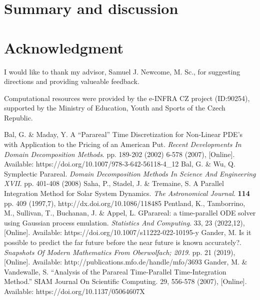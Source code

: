 \documentclass[conference]{IEEEtran}
\begin{document}
\section{Summary and discussion}

\section*{Acknowledgment}

I would like to thank my advisor, Samuel J. Newcome, M. Sc., for suggesting directions and providing valueable feedback.

Computational resources were provided by the e-INFRA CZ project (ID:90254),
supported by the Ministry of Education, Youth and Sports of the Czech Republic.

\begin{thebibliography}{00}
Bal, G. \& Maday, Y. A “Parareal” Time Discretization for Non-Linear PDE's with Application to the Pricing of an American Put. {\em Recent Developments In Domain Decomposition Methods}. pp. 189-202 (2002)
6-578 (2007), [Online]. Available: https://doi.org/10.1007/978-3-642-56118-4\_12
Bal, G. \& Wu, Q. Symplectic Parareal. {\em Domain Decomposition Methods In Science And Engineering XVII}. pp. 401-408 (2008)
Saha, P., Stadel, J. \& Tremaine, S. A Parallel Integration Method for Solar System Dynamics. {\em The Astronomical Journal}. \textbf{114} pp. 409 (1997,7), http://dx.doi.org/10.1086/118485
Pentland, K., Tamborrino, M., Sullivan, T., Buchanan, J. \& Appel, L. GParareal: a time-parallel ODE solver using Gaussian process emulation. {\em Statistics And Computing}. 33, 23 (2022,12), [Online]. Available: https://doi.org/10.1007/s11222-022-10195-y
Gander, M. Is it possible to predict the far future before the near future is known accurately?. {\em Snapshots Of Modern Mathematics From Oberwolfach; 2019}. pp. 21 (2019), [Online]. Available: http://publications.mfo.de/handle/mfo/3693
Gander, M. \& Vandewalle, S. ``Analysis of the Parareal Time‐Parallel Time‐Integration Method.'' SIAM Journal On Scientific Computing. 29, 556-578 (2007), [Online]. Available: https://doi.org/10.1137/05064607X
\end{thebibliography}
\end{document}
